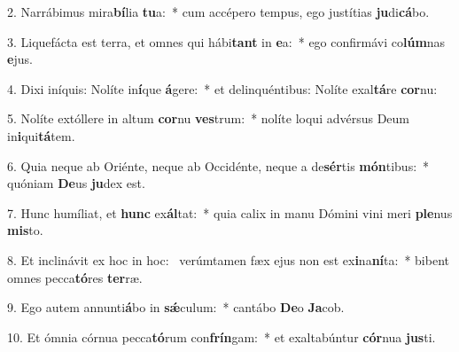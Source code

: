 2. Narrábimus mira\textbf{bí}lia \textbf{tu}a:~*  cum accépero tempus, ego justítias \textbf{ju}di\textbf{cá}bo.\

3. Liquefácta est terra, et omnes qui hábi\textbf{tant} in \textbf{e}a:~*  ego confirmávi co\textbf{lúm}nas \textbf{e}jus.\

4. Dixi iníquis: Nolíte in\textbf{í}que \textbf{á}gere:~*  et delinquéntibus: Nolíte exal\textbf{tá}re \textbf{cor}nu:\

5. Nolíte extóllere in altum \textbf{cor}nu \textbf{ves}trum:~*  nolíte loqui advérsus Deum in\textbf{i}qui\textbf{tá}tem.\

6. Quia neque ab Oriénte, neque ab Occidénte, neque a de\textbf{sér}tis \textbf{món}tibus:~*  quóniam \textbf{De}us \textbf{ju}dex est.\

7. Hunc humíliat, et \textbf{hunc} ex\textbf{ál}tat:~*  quia calix in manu Dómini vini meri \textbf{ple}nus \textbf{mis}to.\

8. Et inclinávit ex hoc in hoc: \dag\  verúmtamen fæx ejus non est ex\textbf{i}na\textbf{ní}ta:~*  bibent omnes pecca\textbf{tó}res \textbf{ter}ræ.\

9. Ego autem annunti\textbf{á}bo in \textbf{sǽ}culum:~*  cantábo \textbf{De}o \textbf{Ja}cob.\

10. Et ómnia córnua pecca\textbf{tó}rum con\textbf{frín}gam:~*  et exaltabúntur \textbf{cór}nua \textbf{jus}ti.\

